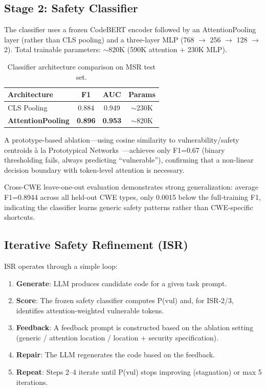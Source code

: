 \documentclass[sigconf,10pt]{acmart}
\begin{document}
\subsection{Stage 2: Safety Classifier}

The classifier uses a frozen CodeBERT encoder followed by an AttentionPooling layer (rather than CLS pooling) and a three-layer MLP (768 $\rightarrow$ 256 $\rightarrow$ 128 $\rightarrow$ 2). Total trainable parameters: $\sim$820K (590K attention + 230K MLP).

\begin{table}[h]
\centering
\caption{Classifier architecture comparison on MSR test set.}
\begin{tabular}{lccc}
\toprule
Architecture & F1 & AUC & Params \\
\midrule
CLS Pooling & 0.884 & 0.949 & $\sim$230K \\
\textbf{AttentionPooling} & \textbf{0.896} & \textbf{0.953} & $\sim$820K \\
\bottomrule
\end{tabular}
\end{table}

A prototype-based ablation---using cosine similarity to vulnerability/safety centroids \`{a} la Prototypical Networks~\cite{protonet}---achieves only F1=0.67 (binary thresholding fails, always predicting ``vulnerable''), confirming that a non-linear decision boundary with token-level attention is necessary.

Cross-CWE leave-one-out evaluation demonstrates strong generalization: average F1=0.8944 across all held-out CWE types, only 0.0015 below the full-training F1, indicating the classifier learns generic safety patterns rather than CWE-specific shortcuts.

\subsection{Iterative Safety Refinement (ISR)}

ISR operates through a simple loop:

\begin{enumerate}
\item \textbf{Generate}: LLM produces candidate code for a given task prompt.
\item \textbf{Score}: The frozen safety classifier computes P(vul) and, for ISR-2/3, identifies attention-weighted vulnerable tokens.
\item \textbf{Feedback}: A feedback prompt is constructed based on the ablation setting (generic / attention location / location + security specification).
\item \textbf{Repair}: The LLM regenerates the code based on the feedback.
\item \textbf{Repeat}: Steps 2--4 iterate until P(vul) stops improving (stagnation) or max 5 iterations.
\end{enumerate}
\end{document}
